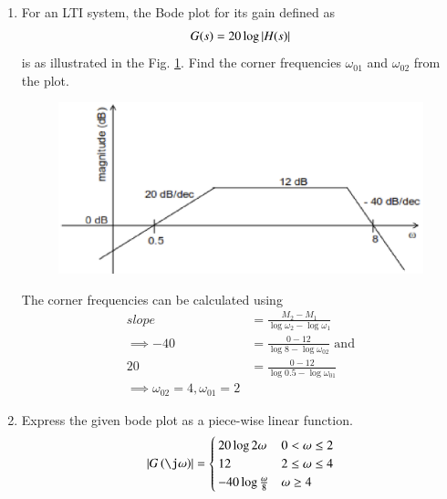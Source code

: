 \begin{enumerate}[label=\thesection.\arabic*.,ref=\thesection.\theenumi]

\item For an LTI system, the Bode plot for its gain defined as
\begin{align}
	G(s) = 20\log \left\vert H(s)\right\vert
	\label{eq:ep18btech11016_gain}
\end{align}
is as illustrated in the Fig. \ref{fig:ep18btech11016_bode}. Find the corner frequencies $\omega_{01}$ and $\omega_{02}$ from the plot.

\begin{figure}[ht!]
\centering
    \includegraphics[width=\columnwidth]{./figs/ep18btech11016/ep18btech11016_fig1.eps}
    \caption{}
    \label{fig:ep18btech11016_bode}
\end{figure}

\solution
The corner frequencies can be calculated using 
\begin{align}
    slope &= \frac{M_2 - M_1}{\log \omega_2 - \log \omega_1}
\\
\implies    -40 &= \frac{0 - 12}{\log 8 - \log \omega_{02}} \text{ and}
\\
    20 &= \frac{0 - 12}{\log 0.5 - \log \omega_{01}}
\\
\implies     \omega_{02} = 4,    \omega_{01} = 2
\end{align}


\item Express the given bode plot as a piece-wise linear function.
\\
\solution
\begin{align}
\abs{ G\brak{\j\omega}} = 
 \begin{cases} 
        20\log 2\omega & 0 < \omega \leq 2 \\
      12 & 2 \leq \omega \leq 4 \\
      -40\log\frac{\omega}{8} & \omega \geq 4
 \end{cases}
\end{align}


\end{enumerate}

